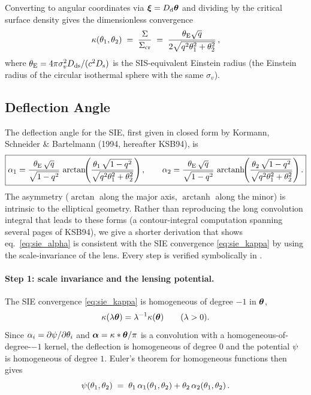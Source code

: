 Converting to angular coordinates via $\boldsymbol{\xi} = D_{\mathrm{d}}\boldsymbol{\theta}$ and
dividing by the critical surface density gives the dimensionless
convergence
\begin{equation}
    \kappa(\theta_1, \theta_2)
    \;=\; \frac{\Sigma}{\Sigma_{\mathrm{cr}}}
    \;=\; \frac{\theta_{\mathrm{E}}\sqrt{q}}{2\sqrt{q^2\theta_1^2 + \theta_2^2}} \,,
    \label{eq:sie_kappa}
\end{equation}
where $\theta_{\mathrm{E}} = 4\pi\sigma_v^2D_{\mathrm{ds}}/(c^2D_{\mathrm{s}})$ is the
SIS-equivalent Einstein radius (the Einstein radius of the circular
isothermal sphere with the same $\sigma_v$).

\subsection{Deflection Angle}
\label{sec:sie_deflection}

The deflection angle for the SIE, first given in closed form by
Kormann, Schneider \& Bartelmann (1994, hereafter KSB94), is
\begin{equation}
    \boxed{
    \alpha_1 = \frac{\theta_{\mathrm{E}}\,\sqrt{q}}{\sqrt{1 - q^2}}
    \,\arctan\!\!\left(
    \frac{\theta_1\,\sqrt{1 - q^2}}
         {\sqrt{q^2\theta_1^2 + \theta_2^2}}\right),
    \qquad
    \alpha_2 = \frac{\theta_{\mathrm{E}}\,\sqrt{q}}{\sqrt{1 - q^2}}
    \,\operatorname{arctanh}\!\!\left(
    \frac{\theta_2\,\sqrt{1 - q^2}}
         {\sqrt{q^2\theta_1^2 + \theta_2^2}}\right).}
    \label{eq:sie_alpha}
\end{equation}
The asymmetry ($\arctan$ along the major axis, $\operatorname{arctanh}$
along the minor) is intrinsic to the elliptical geometry.  Rather
than reproducing the long convolution integral that leads to these
forms (a contour-integral computation spanning several pages of
KSB94), we give a shorter derivation that shows eq.~\eqref{eq:sie_alpha}
is consistent with the SIE convergence \eqref{eq:sie_kappa} by using
the scale-invariance of the lens.  Every step is verified symbolically
in
.

\paragraph{Step 1: scale invariance and the lensing potential.}
The SIE convergence \eqref{eq:sie_kappa} is homogeneous of degree
$-1$ in $\boldsymbol{\theta}$,
\begin{equation*}
    \kappa(\lambda\boldsymbol{\theta}) = \lambda^{-1}\kappa(\boldsymbol{\theta})
    \qquad (\lambda > 0).
\end{equation*}
Since $\alpha_i = \partial\psi/\partial\theta_i$ and
$\boldsymbol{\alpha} = \kappa * \boldsymbol{\theta}/\pi$ is a convolution with a
homogeneous-of-degree-$-1$ kernel, the deflection is homogeneous of
degree $0$ and the potential $\psi$ is homogeneous of degree $1$.
Euler's theorem for homogeneous functions then gives
\begin{equation}
    \psi(\theta_1, \theta_2)
    \;=\; \theta_1\,\alpha_1(\theta_1,\theta_2)
        + \theta_2\,\alpha_2(\theta_1,\theta_2) \,.
    \label{eq:sie_euler}
\end{equation}

